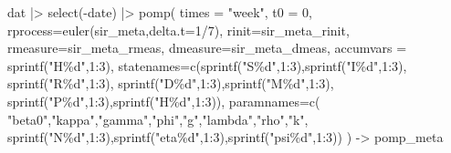 \documentclass[
  letterpaper,
  DIV=11,
  numbers=noendperiod]{scrartcl}
\newenvironment{Shaded}{\begin{snugshade}}{\end{snugshade}}
\newcommand{\AttributeTok}[1]{\textcolor[rgb]{0.40,0.45,0.13}{#1}}
\newcommand{\DecValTok}[1]{\textcolor[rgb]{0.68,0.00,0.00}{#1}}
\newcommand{\FunctionTok}[1]{\textcolor[rgb]{0.28,0.35,0.67}{#1}}
\newcommand{\NormalTok}[1]{\textcolor[rgb]{0.00,0.23,0.31}{#1}}
\newcommand{\OtherTok}[1]{\textcolor[rgb]{0.00,0.23,0.31}{#1}}
\newcommand{\SpecialCharTok}[1]{\textcolor[rgb]{0.37,0.37,0.37}{#1}}
\newcommand{\StringTok}[1]{\textcolor[rgb]{0.13,0.47,0.30}{#1}}
\begin{document}
\begin{Shaded}
\begin{Highlighting}[]
\NormalTok{dat }\SpecialCharTok{|\textgreater{}} \FunctionTok{select}\NormalTok{(}\SpecialCharTok{{-}}\NormalTok{date) }\SpecialCharTok{|\textgreater{}}
  \FunctionTok{pomp}\NormalTok{(}
    \AttributeTok{times =} \StringTok{"week"}\NormalTok{, }\AttributeTok{t0 =} \DecValTok{0}\NormalTok{, }
    \AttributeTok{rprocess=}\FunctionTok{euler}\NormalTok{(sir\_meta,}\AttributeTok{delta.t=}\DecValTok{1}\SpecialCharTok{/}\DecValTok{7}\NormalTok{),}
    \AttributeTok{rinit=}\NormalTok{sir\_meta\_rinit, }\AttributeTok{rmeasure=}\NormalTok{sir\_meta\_rmeas,}
    \AttributeTok{dmeasure=}\NormalTok{sir\_meta\_dmeas, }\AttributeTok{accumvars =} \FunctionTok{sprintf}\NormalTok{(}\StringTok{"H\%d"}\NormalTok{,}\DecValTok{1}\SpecialCharTok{:}\DecValTok{3}\NormalTok{),}
    \AttributeTok{statenames=}\FunctionTok{c}\NormalTok{(}\FunctionTok{sprintf}\NormalTok{(}\StringTok{"S\%d"}\NormalTok{,}\DecValTok{1}\SpecialCharTok{:}\DecValTok{3}\NormalTok{),}\FunctionTok{sprintf}\NormalTok{(}\StringTok{"I\%d"}\NormalTok{,}\DecValTok{1}\SpecialCharTok{:}\DecValTok{3}\NormalTok{),}
      \FunctionTok{sprintf}\NormalTok{(}\StringTok{"R\%d"}\NormalTok{,}\DecValTok{1}\SpecialCharTok{:}\DecValTok{3}\NormalTok{), }\FunctionTok{sprintf}\NormalTok{(}\StringTok{"D\%d"}\NormalTok{,}\DecValTok{1}\SpecialCharTok{:}\DecValTok{3}\NormalTok{),}\FunctionTok{sprintf}\NormalTok{(}\StringTok{"M\%d"}\NormalTok{,}\DecValTok{1}\SpecialCharTok{:}\DecValTok{3}\NormalTok{),}
      \FunctionTok{sprintf}\NormalTok{(}\StringTok{"P\%d"}\NormalTok{,}\DecValTok{1}\SpecialCharTok{:}\DecValTok{3}\NormalTok{),}\FunctionTok{sprintf}\NormalTok{(}\StringTok{"H\%d"}\NormalTok{,}\DecValTok{1}\SpecialCharTok{:}\DecValTok{3}\NormalTok{)),}
    \AttributeTok{paramnames=}\FunctionTok{c}\NormalTok{(}
      \StringTok{"beta0"}\NormalTok{,}\StringTok{"kappa"}\NormalTok{,}\StringTok{"gamma"}\NormalTok{,}\StringTok{"phi"}\NormalTok{,}\StringTok{"g"}\NormalTok{,}\StringTok{"lambda"}\NormalTok{,}\StringTok{"rho"}\NormalTok{,}\StringTok{"k"}\NormalTok{, }
      \FunctionTok{sprintf}\NormalTok{(}\StringTok{"N\%d"}\NormalTok{,}\DecValTok{1}\SpecialCharTok{:}\DecValTok{3}\NormalTok{),}\FunctionTok{sprintf}\NormalTok{(}\StringTok{"eta\%d"}\NormalTok{,}\DecValTok{1}\SpecialCharTok{:}\DecValTok{3}\NormalTok{),}\FunctionTok{sprintf}\NormalTok{(}\StringTok{"psi\%d"}\NormalTok{,}\DecValTok{1}\SpecialCharTok{:}\DecValTok{3}\NormalTok{))}
\NormalTok{  ) }\OtherTok{{-}\textgreater{}}\NormalTok{ pomp\_meta}
\end{Highlighting}
\end{Shaded}
\end{document}

